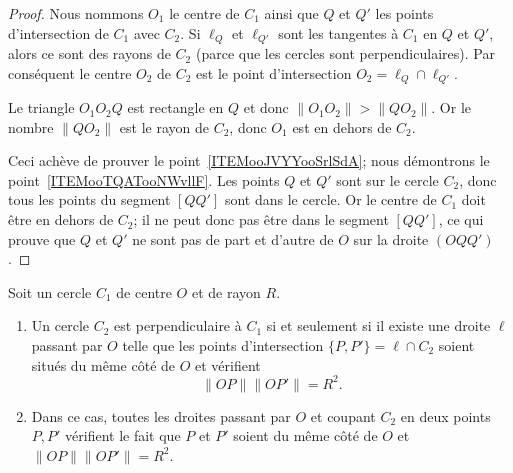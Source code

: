 \begin{proof}
	Nous nommons \( O_1\) le centre de \( C_1\) ainsi que \( Q\) et \( Q'\) les points d'intersection de \( C_1\) avec \( C_2\). Si \( \ell_Q\) et \( \ell_{Q'} \) sont les tangentes à \( C_1\) en \( Q\) et \( Q'\), alors ce sont des rayons de \( C_2\) (parce que les cercles sont perpendiculaires). Par conséquent le centre \( O_2\) de \( C_2\) est le point d'intersection \( O_2=\ell_Q\cap \ell_{Q'}\).

	Le triangle \( O_1O_2Q\) est rectangle en \( Q\) et donc \( \| O_1O_2 \|>\| QO_2 \| \). Or le nombre \( \| QO_2 \|\) est le rayon de \( C_2\), donc \( O_1\) est en dehors de \( C_2\).

	Ceci achève de prouver le point~\ref{ITEMooJVYYooSrlSdA}; nous démontrons le point~\ref{ITEMooTQATooNWvllF}. Les points \( Q\) et \( Q'\) sont sur le cercle \( C_2\), donc tous les points du segment \( [QQ']  \) sont dans le cercle. Or le centre de \( C_1\) doit être en dehors de \( C_2\); il ne peut donc pas être dans le segment \( [QQ']\), ce qui prouve que \( Q\) et \( Q'\) ne sont pas de part et d'autre de \( O\) sur la droite \( (OQQ')\).
\end{proof}

\begin{proposition}      \label{PROPooYSVYooOFKxib}
	Soit un cercle \( C_1\) de centre \( O\) et de rayon \( R\).
	\begin{enumerate}
		\item       \label{ITEMooWYIJooAAmXUl}
		      Un cercle \( C_2\) est perpendiculaire à \( C_1\) si et seulement si il existe une droite \( \ell\) passant par \( O\) telle que les points d'intersection \( \{ P,P' \}= \ell\cap C_2\) soient situés du même côté de \( O\) et vérifient
		      \begin{equation}
			      \| OP \|\| OP' \|=R^2.
		      \end{equation}
		\item       \label{ITEMooYKZOooYZKyhF}
		      Dans ce cas, toutes les droites passant par \( O\) et coupant \( C_2\) en deux points \( P,P'\) vérifient le fait que \( P\) et \( P'\) soient du même côté de \( O\) et \( \| OP \|\| OP' \|=R^2\).
	\end{enumerate}
\end{proposition}

